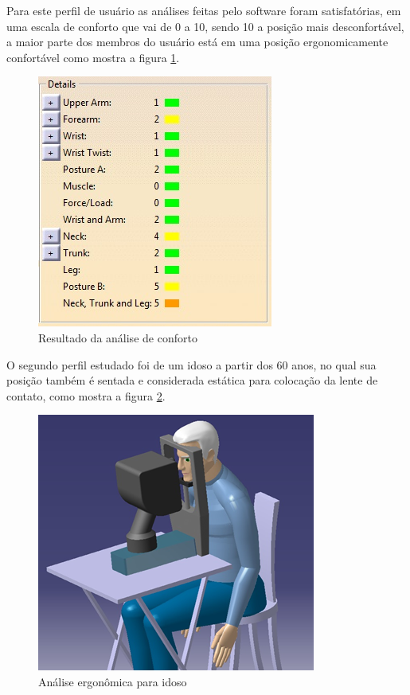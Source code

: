 Para este perfil de usuário as análises feitas pelo software foram satisfatórias, em uma escala de conforto que vai de 0 a 10, sendo 10 a posição mais desconfortável, a maior parte dos membros do usuário está em uma posição ergonomicamente confortável como mostra a figura \ref{adulto2}.

\begin{figure}[H]
		\centering
			\includegraphics[scale=1.0]{figuras/adulto2.png}
		\caption{Resultado da análise de conforto}
		\label{adulto2}
\end{figure}

O segundo perfil estudado foi de um idoso a partir dos 60 anos, no qual sua posição também é sentada e considerada estática para colocação da lente de contato, como mostra a figura \ref{idoso}. 


\begin{figure}[H]
		\centering
			\includegraphics[scale=0.8]{figuras/idoso.png}
		\caption{Análise ergonômica para idoso}
		\label{idoso}
\end{figure}


